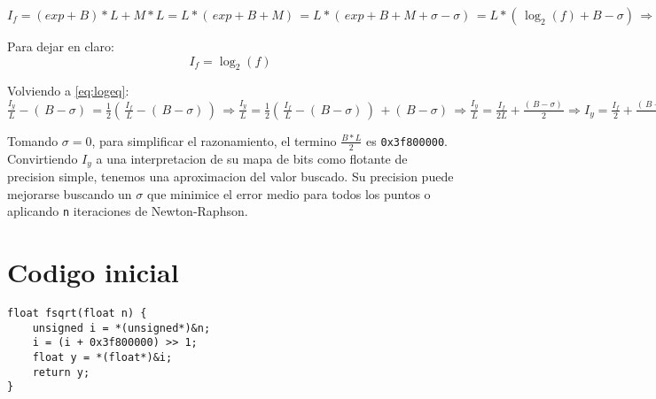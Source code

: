 \documentclass[]{article}
\begin{document}
\(I_f = (exp + B)*L + M*L = L*(\,exp+B+M)\,=L*(\,exp+B+M+\sigma-\sigma)\,=L*(\,\log_2(f)+B-\sigma)\,\Rightarrow\frac{I_f}{L}-(\,B-\sigma)\,=\log_2(f)\)

Para dejar en claro:
\begin{equation}
I_f = \log_2(f)
\end{equation}

Volviendo a \eqref{eq:logeq}: \(\frac{I_y}{L}-(\,B-\sigma)\,=\frac{1}{2}(\, \frac{I_f}{L}-(\,B-\sigma)\,)\,\Rightarrow \frac{I_y}{L}=\frac{1}{2}(\,\frac{I_f}{L}-(\,B-\sigma)\,)\,+(\,B-\sigma)\,\Rightarrow  \frac{I_y}{L}=\frac{I_f}{2L}+\frac{(\,B-\sigma)\,}{2}\Rightarrow  I_y=\frac{I_f}{2}+\frac{(\,B-\sigma)\,*L}{2}\)

Tomando \(\sigma=0\), para simplificar el razonamiento, el termino \(\frac{B*L}{2}\) es \verb|0x3f800000|. Convirtiendo \(I_y\) a una interpretacion de su mapa de bits como flotante de precision simple, tenemos una aproximacion del valor buscado. Su precision puede mejorarse buscando un \(\sigma\) que minimice el error medio para todos los puntos o aplicando \verb|n| iteraciones de Newton-Raphson.
	
\section{Codigo inicial}
\begin{lstlisting}
float fsqrt(float n) {
	unsigned i = *(unsigned*)&n;
	i = (i + 0x3f800000) >> 1;
	float y = *(float*)&i;  
	return y;
}
\end{lstlisting}
	
	
\end{document}
